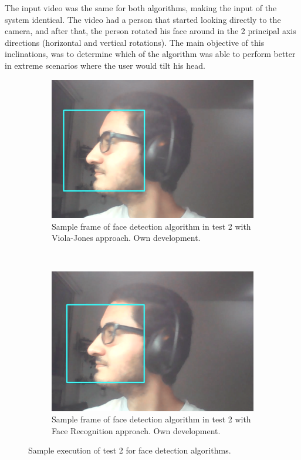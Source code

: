 \documentclass[11pt]{report} %
\begin{document}
The input video was the same for both algorithms, making the input of the system identical. The video had a person that started looking directly to the camera, and after that, the person rotated his face around in the 2 principal axis directions (horizontal and vertical rotations). The main objective of this inclinations, was to determine which of the algorithm was able to perform better in extreme scenarios where the user would tilt his head.\\


\begin{figure}[H]
	\centering
	\begin{subfigure}{.5\textwidth}
		\centering
		\includegraphics[width=1.0\linewidth]{assets/imgs/computer_vision/face_detection_ex_2_hc.png}
		\caption{Sample frame of face detection algorithm in test 2 with Viola-Jones approach. Own development.}
		\label{fig_computer_vision_test_2_a}
	\end{subfigure}~
	\begin{subfigure}{.5\textwidth}
		\centering
		\includegraphics[width=1.0\linewidth]{assets/imgs/computer_vision/face_detection_ex_2_fr.png}
		\caption{Sample frame of face detection algorithm in test 2 with Face Recognition approach. Own development.}
		\label{fig_computer_vision_test_2_b}
	\end{subfigure}%
	\caption{Sample execution of test 2 for face detection algorithms.}
	\label{fig_computer_vision_test_2}
\end{figure}
\end{document}
